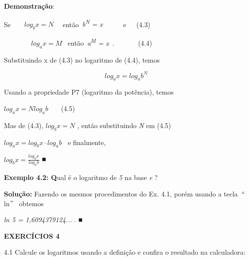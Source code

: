 \documentclass[12pt]{article}
\begin{document}
\begin{enumerate}[label*={\fontsize{14pt}{14pt}\selectfont \textbf{\arabic*.}}]
\begin{enumerate}
\textbf{Demonstração}:\par

Se\ \ \ \   \( log_{b}x=N \) \ \  então\  \textit{b\textsuperscript{N} = x}\ \ \ \ \ \  e\tab \tab \tab \tab \tab \ \ \  (4.3)\par

\ \ \ \ \ \ \ \   \( log_{a}x=M \) \  então\  \textit{a\textsuperscript{M} = x}\ .\ \ \ \   \tab \tab \tab \tab \tab \ \ \  (4.4)\par

Substituindo x de (4.3) no logaritmo de (4.4), temos\par

 \[ log_{a}x=log_{a}b^{N} \] \par

Usando a propriedade P7 (logaritmo da potência), temos\par

\tab \tab  \( log_{a}x=Nlog_{a}b^{} \) \tab \tab \tab \tab \tab \tab \tab \ \ \  (4.5)\par

Mas de (4.3),  \( log_{b}x=N \) , então substituindo \textit{N} em (4.5)\par

\tab \tab  \( log_{a}x=log_{b}x  \cdot  log_{a}b^{} \) \  e finalmente,\par


\vspace{\baselineskip}
\tab \tab  \( log_{b}x=\frac{log_{a}x}{log_{a}b} \)  ■\par


\vspace{\baselineskip}
\textbf{Exemplo 4.2: Q}ual é o logaritmo de \textit{5} na base \textit{e} ? \par

\textbf{Solução: }Fazendo os mesmos procedimentos do Ex. 4.1, porém usando a tecla\  $``$ln$"$ \  obtemos \par

\textit{ ln 5 = 1,6094379124...} . ■\par


\vspace{\baselineskip}
{\fontsize{14pt}{16.8pt}\selectfont \textbf{EXERCÍCIOS 4}\par}\par


\vspace{\baselineskip}
\begin{justify}
4.1 Calcule os logaritmos usando a definição e confira o resultado na calculadora:
\end{justify}\par


\end{enumerate}
\end{enumerate}
\end{document}
